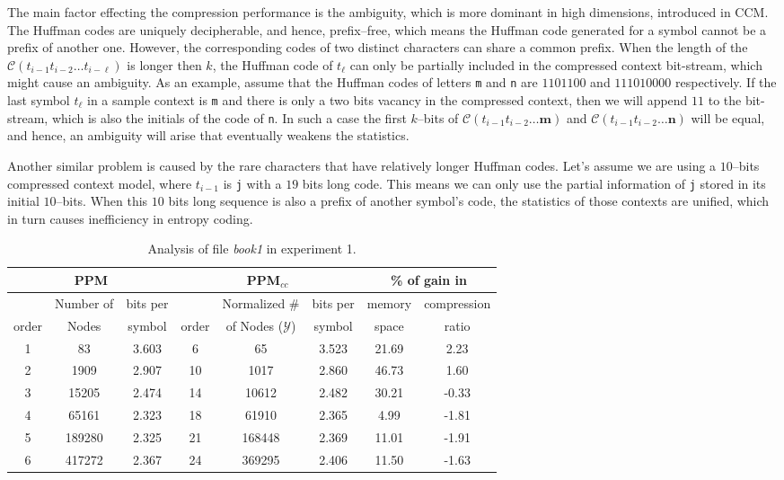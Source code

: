 \documentclass[runningheads,a4paper]{llncs}
\begin{document}
The main factor effecting the compression performance is the ambiguity, which is more dominant in high dimensions, 
introduced in CCM. The Huffman codes are uniquely decipherable, and hence, prefix--free, which means the Huffman code
generated for a symbol cannot be a prefix of another one. 
However, the corresponding codes of two distinct characters can share a common prefix. 
When the length of the $\mathcal{C}(t_{i-1}t_{i-2} \ldots t_{i-\ell})$ is longer then $k$, the Huffman code of
$t_\ell$ can only be partially included in the compressed context bit-stream, which might cause an ambiguity. 
As an example, assume that the Huffman codes of letters \texttt{m} and \texttt{n} are $1101100$ and $111010000$
respectively. 
If the last symbol $t_\ell$ in a sample context is \texttt{m} and there is only a two bits vacancy in the compressed
context, then we will append $11$ to the bit-stream, which is also the initials of the code of \texttt{n}. 
In such a case the first $k$--bits of $\mathcal{C}(t_{i-1}t_{i-2} \ldots \mathbf{m})$ and $\mathcal{C}(t_{i-1}t_{i-2}
\ldots \mathbf{n})$ will be equal, and hence, an ambiguity will arise that eventually weakens the statistics.

Another similar problem is caused by the rare characters that have relatively longer Huffman codes. 
Let's assume we are using a $10$--bits compressed context model, where $t_{i-1}$ is \texttt{j} with a $19$ bits long
code. This means we can only use the partial information of \texttt{j} stored in its initial $10$--bits. 
When this $10$ bits long sequence is also a prefix of another symbol's code, the statistics of those contexts are
unified, which in turn causes inefficiency in entropy coding. 

\begin{table}
\begin{center}
\begin{tabular}{c|c|c||c|c|c||c|c|}
\multicolumn{3}{c||}{PPM} &  \multicolumn{3}{c||}{PPM$_{cc}$} & \multicolumn{2}{c}{\% of gain in} \\ \hline
      & Number of &  bits per   &         & Normalized \#            &  bits per &  memory     &
\multicolumn{1}{|c|}{compression} \\
order & Nodes     &  symbol & order   & of Nodes ($\mathcal{Y}$) &   symbol &  space  &   
\multicolumn{1}{|c|}{ratio} \\ \hline 
1 & 83     & 3.603 & 6  & 65      & 3.523 & 21.69 & 2.23 \\
2 & 1909   & 2.907 & 10 & 1017    & 2.860 & 46.73 & 1.60 \\
3 & 15205  & 2.474 & 14 & 10612   & 2.482 & 30.21 & -0.33 \\
4 & 65161  & 2.323 & 18 & 61910   & 2.365 & 4.99  & -1.81 \\
5 & 189280 & 2.325 & 21 & 168448  & 2.369 & 11.01 & -1.91 \\
6 & 417272 & 2.367 & 24 & 369295  & 2.406 & 11.50 & -1.63 \\
\end{tabular}
\end{center}
\caption{Analysis of file \emph{book1} in experiment 1.}
\label{tab:experiment1book1}
\end{table} 
\end{document}
